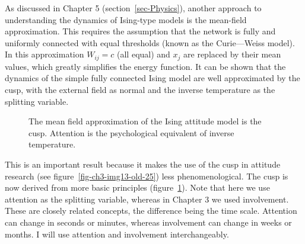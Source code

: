 \documentclass[
  a4paper,
  DIV=11,
  numbers=noendperiod,
  oneside]{scrreprt}
\begin{document}
As discussed in Chapter 5 (section~\ref{sec-Physics}), another approach
to understanding the dynamics of Ising-type models is the mean-field
approximation. This requires the assumption that the network is fully
and uniformly connected with equal thresholds (known as the
Curie---Weiss model). In this approximation \(W_{ij} = c\) (all equal)
and \(x_{j}\) are replaced by their mean values, which greatly
simplifies the energy function. It can be shown that the dynamics of the
simple fully connected Ising model are well approximated by the cusp,
with the external field as normal and the inverse temperature as the
splitting variable.

\begin{figure}


\caption{\label{fig-ch6-img11-old-80}The mean field approximation of the
Ising attitude model is the cusp. Attention is the psychological
equivalent of inverse temperature.}

\end{figure}%

This is an important result because it makes the use of the cusp in
attitude research (see figure~\ref{fig-ch3-img13-old-25}) less
phenomenological. The cusp is now derived from more basic principles
(figure~\ref{fig-ch6-img11-old-80}). Note that here we use attention as
the splitting variable, whereas in Chapter 3 we used involvement. These
are closely related concepts, the difference being the time scale.
Attention can change in seconds or minutes, whereas involvement can
change in weeks or months. I will use attention and involvement
interchangeably.
\end{document}
